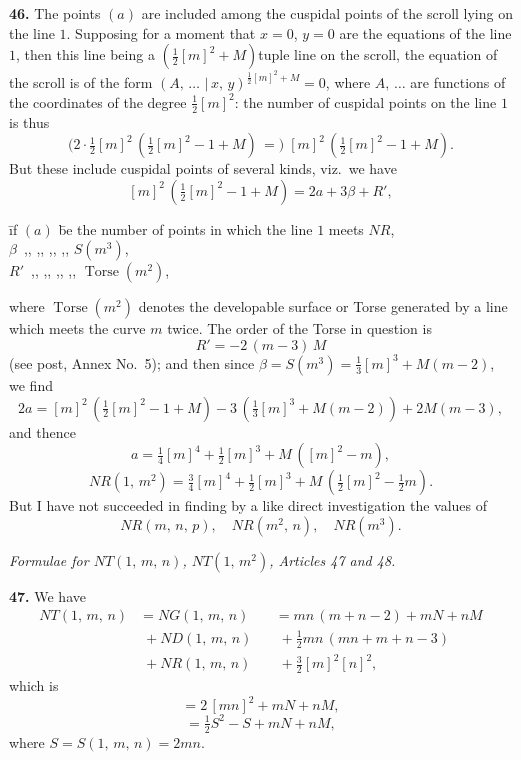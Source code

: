 \documentclass[11pt,a4paper]{article}
\providecommand{\mid}{\,|\,}
\providecommand{\Torse}{\operatorname{Torse}}
\begin{document}
\medskip

\textbf{46.} The points $(a)$ are included among the cuspidal points of the scroll lying on the line $1$. Supposing for a moment that $x = 0$, $y = 0$ are the equations of the line $1$, then this line being a $(\tfrac{1}{2}[m]^2 + M)$tuple line on the scroll, the equation of the scroll is of the form $(A,\,\ldots\, \mid x,\,y)^{\frac{1}{2}[m]^2 + M} = 0$, where $A,\,\ldots$ are functions of the coordinates of the degree $\tfrac{1}{2}[m]^2$: the number of cuspidal points on the line $1$ is thus
\[
\bigl(2 \cdot \tfrac{1}{2}[m]^2\,(\tfrac{1}{2}[m]^2 - 1 + M)\,=\bigr)\;[m]^2\,(\tfrac{1}{2}[m]^2 - 1 + M).
\]
But these include cuspidal points of several kinds, viz.\ we have
\[
[m]^2\,(\tfrac{1}{2}[m]^2 - 1 + M) = 2a + 3\beta + R',
\]
\begin{tabbing}
\hspace{4em}\=if $(a)$ \=be the number of points in which the line $1$ meets $NR$,\\
\>$\beta$   \>$\,$,, \;,, \;,, \;,, \quad $S(m^3)$,\\
\>$R'$      \>$\,$,, \;,, \;,, \;,, \quad $\Torse(m^2)$,
\end{tabbing}
where $\Torse(m^2)$ denotes the developable surface or Torse generated by a line which meets the curve $m$ twice. The order of the Torse in question is
\[
R' = -2\,(m-3)\,M
\]
(see post, Annex No.~5); and then since $\beta = S(m^3) = \tfrac{1}{3}[m]^3 + M(m-2)$, we find
\[
2a = [m]^2\,(\tfrac{1}{2}[m]^2 - 1 + M) - 3\,(\tfrac{1}{3}[m]^3 + M(m-2)) + 2M(m-3),
\]
and thence
\[
a = \tfrac{1}{4}[m]^4 + \tfrac{1}{2}[m]^3 + M\,([m]^2 - m),
\]
\[
NR(1,\,m^2) = \tfrac{3}{4}[m]^4 + \tfrac{1}{2}[m]^3 + M\,(\tfrac{1}{2}[m]^2 - \tfrac{1}{2}m).
\]
But I have not succeeded in finding by a like direct investigation the values of
\[
NR(m,\,n,\,p),\quad NR(m^2,\,n),\quad NR(m^3).
\]

\bigskip

\begin{center}
\textit{Formulae for $NT(1,\,m,\,n)$, $NT(1,\,m^2)$, Articles 47 and 48.}
\end{center}

\textbf{47.} We have
\begin{align*}
NT(1,\,m,\,n) &= NG(1,\,m,\,n) && = mn\,(m+n-2) + mN + nM\\
              &\;+ ND(1,\,m,\,n) && \;+ \tfrac{1}{2}mn\,(mn + m + n - 3)\\
              &\;+ NR(1,\,m,\,n) && \;+ \tfrac{3}{2}[m]^2 [n]^2,
\end{align*}
which is
\[
= 2\,[mn]^2 + mN + nM,
\]
\[
= \tfrac{1}{2}S^2 - S + mN + nM,
\]
where $S = S(1,\,m,\,n) = 2mn$.
\end{document}

